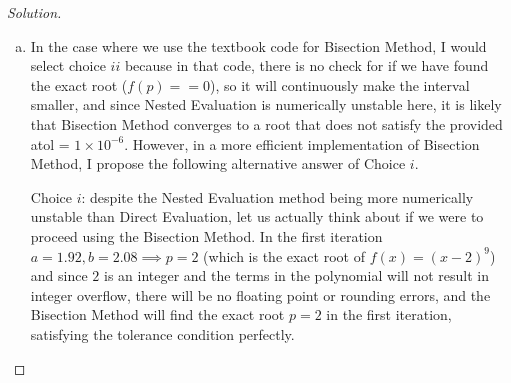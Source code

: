 \documentclass[12pt]{scrartcl}
\begin{document}
\begin{proof}[Solution]
\begin{enumerate}[(a)]
\item In the case where we use the textbook code for Bisection Method, I would select choice $ii$ because in that code, 
there is no check for if we have found the exact root ($f(p) == 0$), so it will continuously make the interval smaller, and since Nested Evaluation is numerically unstable here, it is likely that Bisection Method 
converges to a root that does not satisfy the provided atol = $1 \times 10^{-6}$. However, in a more efficient implementation of Bisection Method, I propose 
the following alternative answer of Choice $i$. 

Choice $i$: despite the Nested Evaluation method being more numerically unstable than Direct Evaluation, let us actually think about if we were to 
proceed using the Bisection Method. In the first iteration $a = 1.92, b = 2.08 \implies p = 2$ (which is the exact root of $f(x) = (x-2)^9$)
and since $2$ is an integer and the terms in the polynomial will not result in integer overflow, there will be no floating point or rounding errors, and the Bisection Method will find the exact 
root $p = 2$ in the first iteration, satisfying the tolerance condition perfectly. 
\end{enumerate}

\end{proof}
\end{document}
